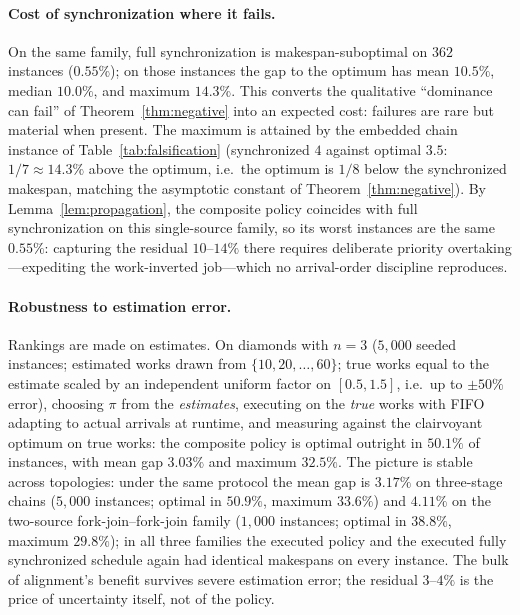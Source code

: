 \documentclass[sn-mathphys,NameDate]{sn-jnl}
\theoremstyle{thmstyleone}
\theoremstyle{thmstylethree}
\theoremstyle{thmstyletwo}
\begin{document}
\paragraph{Cost of synchronization where it fails.}
On the same family, full synchronization is makespan-suboptimal
on $362$ instances ($0.55\%$); on those instances the gap to
the optimum has mean $10.5\%$, median $10.0\%$, and maximum
$14.3\%$. This converts the qualitative ``dominance can
fail'' of Theorem~\ref{thm:negative} into an expected cost:
failures are rare but material when present. The maximum is
attained by the embedded chain instance of
Table~\ref{tab:falsification} (synchronized $4$ against
optimal $3.5$: $1/7 \approx 14.3\%$ above the optimum,
i.e.\ the optimum is $1/8$ below the synchronized makespan,
matching the asymptotic constant of
Theorem~\ref{thm:negative}). By
Lemma~\ref{lem:propagation}, the composite policy coincides
with full synchronization on this single-source family, so its
worst instances are the same $0.55\%$: capturing the residual
$10$--$14\%$ there requires deliberate priority
overtaking---expediting the work-inverted job---which no
arrival-order discipline reproduces.

\paragraph{Robustness to estimation error.}
Rankings are made on estimates. On diamonds with $n = 3$
($5{,}000$ seeded instances; estimated works drawn from
$\{10, 20, \ldots, 60\}$; true works equal to the estimate
scaled by an independent uniform factor on $[0.5, 1.5]$, i.e.\
up to $\pm 50\%$ error), choosing $\pi$ from the
\emph{estimates}, executing on the \emph{true} works with FIFO
adapting to actual arrivals at runtime, and measuring against
the clairvoyant optimum on true works: the composite policy is
optimal outright in $50.1\%$ of instances, with mean gap
$3.03\%$ and maximum $32.5\%$. The picture is stable across
topologies: under the same protocol the mean gap is $3.17\%$
on three-stage chains ($5{,}000$ instances; optimal in
$50.9\%$, maximum $33.6\%$) and $4.11\%$ on the two-source
fork-join--fork-join family ($1{,}000$ instances; optimal in
$38.8\%$, maximum $29.8\%$); in all three families the
executed policy and the executed fully synchronized schedule
again had identical makespans on every instance. The bulk of
alignment's benefit survives severe estimation error; the
residual $3$--$4\%$ is the price of uncertainty itself, not of
the policy.
\end{document}
